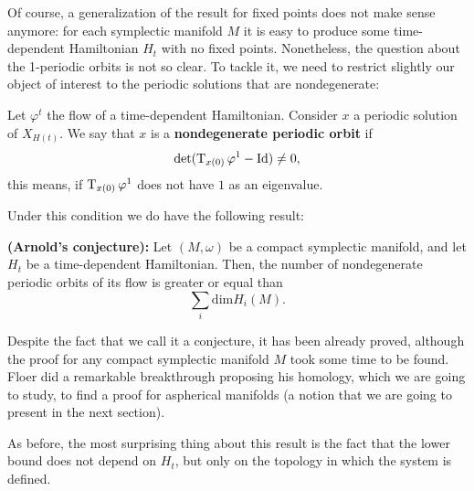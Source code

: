 Of course, a generalization of the result for fixed points does not make sense anymore: for each symplectic manifold $M$ it is easy to produce some time-dependent Hamiltonian $H_t$ with no fixed points. Nonetheless, the question about the 1-periodic orbits is not so clear. To tackle it, we need to restrict slightly our object of interest to the periodic solutions that are nondegenerate:

\begin{deff}
Let $\varphi^t$ the flow of a time-dependent Hamiltonian. Consider $x$ a periodic solution of $X_{H(t)}$. We say that $x$ is a {\bf nondegenerate periodic orbit} if
\[\det(\operatorname T_{x(0)} \varphi^1 - \text{Id}) \neq 0 ,\]
this means, if $\operatorname T_{x(0)} \varphi^1$ does not have $1$ as an eigenvalue.
\end{deff}

Under this condition we do have the following result:

\begin{theo}
{\bf (Arnold's conjecture):} Let $(M,\omega)$ be a compact symplectic manifold, and let $H_t$ be a time-dependent Hamiltonian. Then, the number of nondegenerate periodic orbits of its flow is greater or equal than
\[\sum_i \text{dim}H_i(M) .\]
\end{theo}

Despite the fact that we call it a conjecture, it has been already proved, although the proof for any compact symplectic manifold $M$ took some time to be found. Floer did a remarkable breakthrough proposing his homology, which we are going to study, to find a proof for aspherical manifolds (a notion that we are going to present in the next section).

As before, the most surprising thing about this result is the fact that the lower bound does not depend on $H_t$, but only on the topology in which the system is defined.

